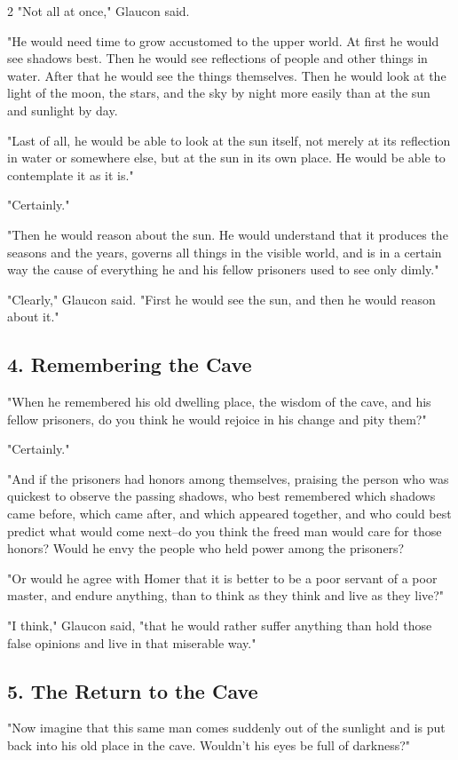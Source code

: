 \documentclass[12pt]{article}
\begin{document}
\begin{multicols}{2}
"Not all at once," Glaucon said.

"He would need time to grow accustomed to the upper world. At first he would see shadows best. Then he would see reflections of people and other things in water. After that he would see the things themselves. Then he would look at the light of the moon, the stars, and the sky by night more easily than at the sun and sunlight by day.

"Last of all, he would be able to look at the sun itself, not merely at its reflection in water or somewhere else, but at the sun in its own place. He would be able to contemplate it as it is."

"Certainly."

"Then he would reason about the sun. He would understand that it produces the seasons and the years, governs all things in the visible world, and is in a certain way the cause of everything he and his fellow prisoners used to see only dimly."

"Clearly," Glaucon said. "First he would see the sun, and then he would reason about it."

\subsection*{4. Remembering the Cave}
"When he remembered his old dwelling place, the wisdom of the cave, and his fellow prisoners, do you think he would rejoice in his change and pity them?"

"Certainly."

"And if the prisoners had honors among themselves, praising the person who was quickest to observe the passing shadows, who best remembered which shadows came before, which came after, and which appeared together, and who could best predict what would come next--do you think the freed man would care for those honors? Would he envy the people who held power among the prisoners?

"Or would he agree with Homer that it is better to be a poor servant of a poor master, and endure anything, than to think as they think and live as they live?"

"I think," Glaucon said, "that he would rather suffer anything than hold those false opinions and live in that miserable way."

\subsection*{5. The Return to the Cave}
"Now imagine that this same man comes suddenly out of the sunlight and is put back into his old place in the cave. Wouldn't his eyes be full of darkness?"


\end{multicols}
\end{document}
